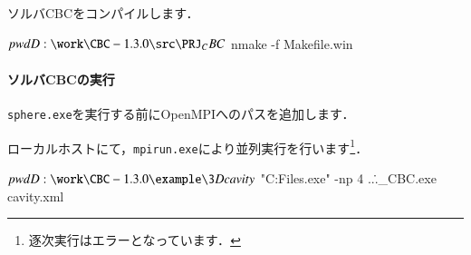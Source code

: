 ソルバCBCをコンパイルします．
{\small
\begin{program}
$ pwd
D:\work\CBC-1.3.0\src\PRJ_CBC
$ nmake -f Makefile.win
\end{program}
}

%
\paragraph{ソルバCBCの実行}
\verb|sphere.exe|を実行する前にOpenMPIへのパスを追加します．

{\small
{}
}

ローカルホストにて，\verb|mpirun.exe|により並列実行を行います\footnote{逐次実行はエラーとなっています．}．
{\small
\begin{program}
$ pwd
D:\work\CBC-1.3.0\example\3Dcavity
$ "C:\Program Files\OpenMPI\bin\mpirun.exe" -np 4  ..\..\src\PRJ_CBC\bin\sphere.exe cavity.xml
\end{program}
}


